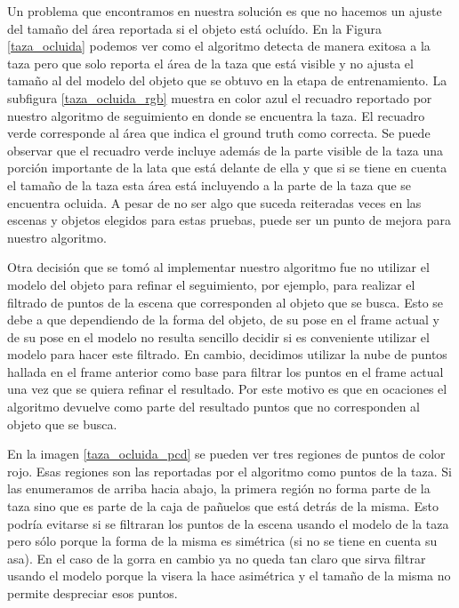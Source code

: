 Un problema que encontramos en nuestra solución es que no hacemos un ajuste del tamaño del área reportada si el objeto está ocluído. En la Figura \ref{taza_ocluida} podemos ver como el algoritmo detecta de manera exitosa a la taza pero que solo reporta el área de la taza que está visible y no ajusta el tamaño al del modelo del objeto que se obtuvo en la etapa de entrenamiento. La subfigura \ref{taza_ocluida_rgb} muestra en color azul el recuadro reportado por nuestro algoritmo de seguimiento en donde se encuentra la taza. El recuadro verde corresponde al área que indica el ground truth como correcta. Se puede observar que el recuadro verde incluye además de la parte visible de la taza una porción importante de la lata que está delante de ella y que si se tiene en cuenta el tamaño de la taza esta área está incluyendo a la parte de la taza que se encuentra ocluida. A pesar de no ser algo que suceda reiteradas veces en las escenas y objetos elegidos para estas pruebas, puede ser un punto de mejora para nuestro algoritmo. 

Otra decisión que se tomó al implementar nuestro algoritmo fue no utilizar el modelo del objeto para refinar el seguimiento, por ejemplo, para realizar el filtrado de puntos de la escena que corresponden al objeto que se busca. Esto se debe a que dependiendo de la forma del objeto, de su pose en el frame actual y de su pose en el modelo no resulta sencillo decidir si es conveniente utilizar el modelo para hacer este filtrado. En cambio, decidimos utilizar la nube de puntos hallada en el frame anterior como base para filtrar los puntos en el frame actual una vez que se quiera refinar el resultado. Por este motivo es que en ocaciones el algoritmo devuelve como parte del resultado puntos que no corresponden al objeto que se busca. 

En la imagen \ref{taza_ocluida_pcd} se pueden ver tres regiones de puntos de color rojo. Esas regiones son las reportadas por el algoritmo como puntos de la taza. Si las enumeramos de arriba hacia abajo, la primera región no forma parte de la taza sino que es parte de la caja de pañuelos que está detrás de la misma. Esto podría evitarse si se filtraran los puntos de la escena usando el modelo de la taza pero sólo porque la forma de la misma es simétrica (si no se tiene en cuenta su asa). En el caso de la gorra en cambio ya no queda tan claro que sirva filtrar usando el modelo porque la visera la hace asimétrica y el tamaño de la misma no permite despreciar esos puntos. 

